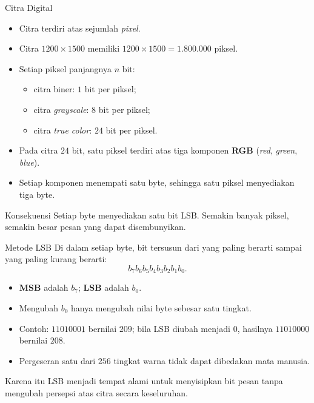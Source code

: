 \documentclass[aspectratio=169,11pt]{beamer}
\begin{document}
\begin{frame}{Citra Digital}
    \begin{itemize}
        \item Citra terdiri atas sejumlah \textit{pixel}.
        \item Citra $1200 \times 1500$ memiliki
              $1200 \times 1500 = 1.800.000$ piksel.
        \item Setiap piksel panjangnya $n$ bit:
              \begin{itemize}
                  \item citra biner: $1$ bit per piksel;
                  \item citra \textit{grayscale}: $8$ bit per piksel;
                  \item citra \textit{true color}: $24$ bit per piksel.
              \end{itemize}
        \item Pada citra $24$ bit, satu piksel terdiri atas tiga komponen
              \textbf{RGB} (\textit{red}, \textit{green}, \textit{blue}).
        \item Setiap komponen menempati satu byte, sehingga satu piksel
              menyediakan tiga byte.
    \end{itemize}
    \vspace{0.1cm}
    \begin{exampleblock}{Konsekuensi}
        \footnotesize
        Setiap byte menyediakan satu bit LSB. Semakin banyak piksel, semakin
        besar pesan yang dapat disembunyikan.
    \end{exampleblock}
\end{frame}

\begin{frame}{Metode LSB}
    Di dalam setiap byte, bit tersusun dari yang paling berarti sampai yang
    paling kurang berarti:
    \[
        b_7b_6b_5b_4b_3b_2b_1b_0.
    \]
    \begin{itemize}
        \item \textbf{MSB} adalah $b_7$; \textbf{LSB} adalah $b_0$.
        \item Mengubah $b_0$ hanya mengubah nilai byte sebesar satu tingkat.
        \item Contoh: $1101000\underline{1}$ bernilai $209$; bila LSB diubah
              menjadi $0$, hasilnya $1101000\underline{0}$ bernilai $208$.
        \item Pergeseran satu dari $256$ tingkat warna tidak dapat dibedakan
              mata manusia.
    \end{itemize}
    \vspace{0.1cm}
    \begin{block}{Karena itu}
        \footnotesize
        LSB menjadi tempat alami untuk menyisipkan bit pesan tanpa mengubah
        persepsi atas citra secara keseluruhan.
    \end{block}
\end{frame}
\end{document}
